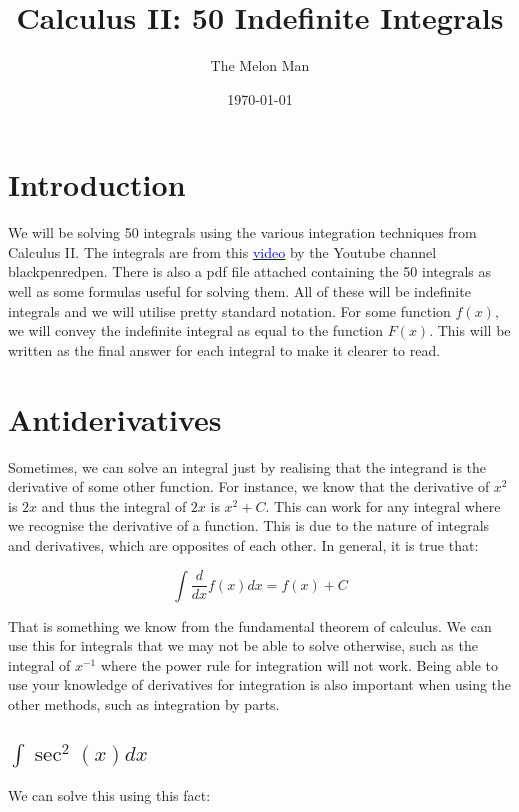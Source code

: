 \documentclass[12pt]{article}
\title{Calculus II: 50 Indefinite Integrals}
\author{The Melon Man}
\date{\today}
\begin{document}
\maketitle
\tableofcontents

\section*{Introduction}

We will be solving 50 integrals using the various integration techniques from Calculus II.
The integrals are from this \href{https://youtu.be/XOUwIdufY9Y}{\textcolor{blue}{{\underline{video}}}} by the Youtube channel blackpenredpen.
There is also a pdf file attached containing the 50 integrals as well as some formulas useful for solving them.
All of these will be indefinite integrals and we will utilise pretty standard notation.
For some function $f(x)$, we will convey the indefinite integral as equal to the function $F(x)$.
This will be written as the final answer for each integral to make it clearer to read.

\section{Antiderivatives}

Sometimes, we can solve an integral just by realising that the integrand is the derivative of some other function.
For instance, we know that the derivative of $x^2$ is $2x$ and thus the integral of $2x$ is $x^2+C$.
This can work for any integral where we recognise the derivative of a function.
This is due to the nature of integrals and derivatives, which are opposites of each other.
In general, it is true that:

$$
    \int \frac{d}{dx}f(x) dx = f(x) + C
$$

That is something we know from the fundamental theorem of calculus.
We can use this for integrals that we may not be able to solve otherwise, such as the integral of $x^{-1}$ where the power rule for integration will not work.
Being able to use your knowledge of derivatives for integration is also important when using the other methods, such as integration by parts.

\subsection{$\int \sec^2(x) dx$}

We can solve this using this fact:
\end{document}
